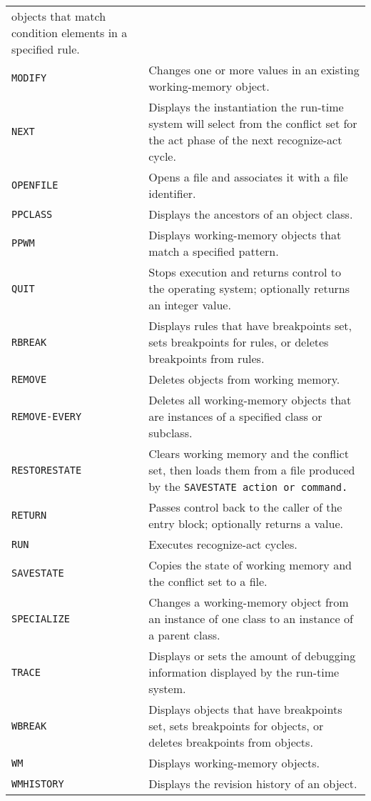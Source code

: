 \begin{longtable}{p{4cm}p{11cm}}
                 objects that match condition elements in a 
                 specified rule. \\\addlinespace
  \tt{MODIFY} & Changes one or more values in an existing 
              working-memory object. \\\addlinespace
  \tt{NEXT} & Displays the instantiation the run-time system 
              will select from the conflict set for the act  
              phase of the next recognize-act cycle. \\\addlinespace
  \tt{OPENFILE} & Opens a file and associates it with a file 
                  identifier. \\\addlinespace
  \tt{PPCLASS} & Displays the ancestors of an object class. \\\addlinespace
  \tt{PPWM} & Displays working-memory objects that match a 
              specified pattern. \\\addlinespace
  \tt{QUIT} & Stops execution and returns control to the 
              operating system; optionally returns an 
              integer value. \\\addlinespace
  \tt{RBREAK} &  Displays rules that have breakpoints set, sets
                breakpoints for rules, or deletes breakpoints
                from rules. \\\addlinespace
  \tt{REMOVE} & Deletes objects from working memory. \\\addlinespace
  \tt{REMOVE-EVERY} & Deletes all working-memory objects that are 
                      instances of a specified class or subclass. \\\addlinespace
  \tt{RESTORESTATE} & Clears working memory and the conflict set,
                      then loads them from a file produced by the 
                      \tt{SAVESTATE} action or command. \\\addlinespace
  \tt{RETURN} & Passes control back to the caller of the entry
                block; optionally returns a value. \\\addlinespace
  \tt{RUN} & Executes recognize-act cycles. \\\addlinespace
  \tt{SAVESTATE} & Copies the state of working memory and the 
                   conflict set to a file. \\\addlinespace
  \tt{SPECIALIZE} & Changes a working-memory object from an 
                    instance of one class to an instance of a 
                    parent class. \\\addlinespace
  \tt{TRACE} & Displays or sets the amount of debugging 
               information displayed by the run-time system. \\\addlinespace
  \tt{WBREAK} & Displays objects that have breakpoints set, 
                sets breakpoints for objects, or deletes 
                breakpoints from objects. \\\addlinespace
  \tt{WM} &  Displays working-memory objects. \\\addlinespace
  \tt{WMHISTORY} & Displays the revision history of an object. \\
  \bottomrule
\end{longtable}

